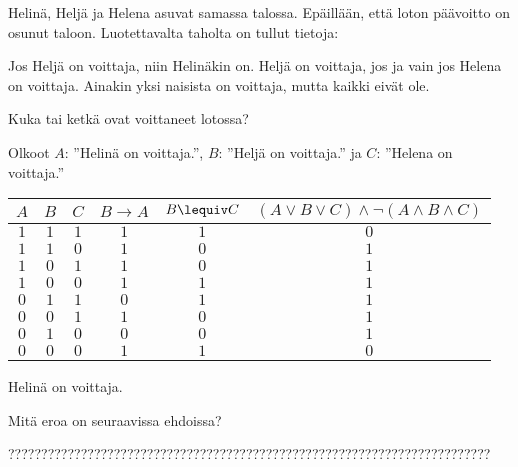 \begin{tehtava}
     Helinä, Heljä ja Helena asuvat samassa talossa. Epäillään, että loton päävoitto on osunut taloon. Luotettavalta taholta on tullut tietoja:

Jos Heljä on voittaja, niin Helinäkin on. 
Heljä on voittaja, jos ja vain jos Helena on voittaja.
Ainakin yksi naisista on voittaja, mutta kaikki eivät ole.

Kuka tai ketkä ovat voittaneet lotossa?

    \begin{vastaus}
    
        Olkoot $A$: ''Helinä on voittaja.'', $B$: ''Heljä on voittaja.'' ja $C$: ''Helena on voittaja.''
        \begin{center}
		    \begin{tabular}{|c|c|c|c|c|c|}\hline
		    $A$ & $B$ & $C$ & $B\to A$ & $B\lequiv C$ & $(A\lor B\lor C)\land \lnot(A\land B\land C)$ \\ \hline
		    $1$ & $1$ & $1$ & $1$ & $1$ & $0$ \\ %
		    $1$ & $1$ & $0$ & $1$ & $0$ & $1$ \\
		    $1$ & $0$ & $1$ & $1$ & $0$ & $1$ \\
		    $1$ & $0$ & $0$ & $1$ & $1$ & $1$ \\
		    $0$ & $1$ & $1$ & $0$ & $1$ & $1$ \\
		    $0$ & $0$ & $1$ & $1$ & $0$ & $1$ \\
		    $0$ & $1$ & $0$ & $0$ & $0$ & $1$ \\
		    $0$ & $0$ & $0$ & $1$ & $1$ & $0$ \\ \hline
\end{tabular}
\end{center}
Helinä on voittaja.
    \end{vastaus}
    
\end{tehtava}

\begin{tehtava}
     Mitä eroa on seuraavissa ehdoissa?
    \begin{alakohdat}
    \end{alakohdat}

    \begin{vastaus}
    
       ????????????????????????????????????????????????????????????????????????? %
    \end{vastaus}
    
\end{tehtava}

